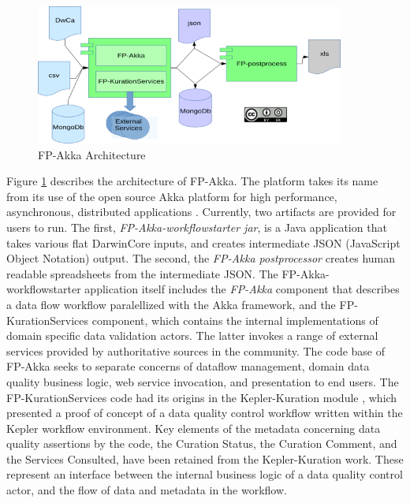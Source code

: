 \documentclass{article}
\begin{document}
\begin{figure}[b!]


\includegraphics[width=4in]{Architecturev4.png}
\caption{FP-Akka Architecture}
\label{fig:architecture}
\end{figure}
Figure \ref{fig:architecture} describes the architecture of FP-Akka. The platform takes its name from its use of  the open source Akka platform for high performance, asynchronous, distributed applications \citep{akka_akka_2015}. Currently, two artifacts are provided for users to run. The first, \emph{FP-Akka-workflowstarter jar}, is a Java application that takes various flat DarwinCore inputs, and creates intermediate JSON (JavaScript Object Notation) \citep{ecmaJSON} output. The second, the \emph{FP-Akka postprocessor}  \citep{FP_postprocess} creates human readable spreadsheets from the intermediate JSON.  The FP-Akka-workflowstarter application itself includes the \emph{FP-Akka} component  that describes a data flow workflow paralellized with the Akka framework, and the FP-KurationServices component, which contains the internal implementations of domain specific data validation actors. The latter invokes a range of external services provided by authoritative sources in the community.   The code base of FP-Akka seeks to separate concerns of dataflow management, domain data quality business logic, web service invocation, and presentation to end users.  The FP-KurationServices code had its origins in the Kepler-Kuration module \citep{dou_kurator_2012, dou_scientific_2011}, which presented a proof of concept of a data quality control workflow written within the Kepler workflow environment.   Key elements of the metadata concerning data quality assertions by the code, the Curation Status, the Curation Comment, and the Services Consulted, have been retained from the Kepler-Kuration work. These represent an interface between the internal business logic of a data quality control actor, and the flow of data and metadata in the workflow. 
\end{document}
